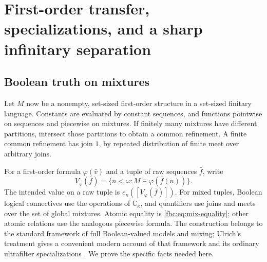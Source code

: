 \documentclass[11pt,letterpaper]{article}
\theoremstyle{definition}
\theoremstyle{remark}
\newcommand{\om}{\omega}
\newcommand{\C}{\mathbb C}
\begin{document}
\section{First-order transfer, specializations, and a sharp infinitary separation}
\label{fbc:sec:logic}

\subsection{Boolean truth on mixtures}
Let $M$ now be a nonempty, set-sized first-order structure in a
set-sized finitary language. Constants are evaluated by constant
sequences, and functions pointwise on sequences and piecewise on
mixtures. If finitely many mixtures have different partitions,
intersect those partitions to obtain a common refinement. A finite
common refinement has join $1$, by repeated distribution of finite meet
over arbitrary joins.

For a first-order formula $\varphi(\bar v)$ and a tuple of raw
sequences $\bar f$, write
\[
 V_\varphi(\bar f)=
 \{n<\om:M\models\varphi(\bar f(n))\}.
\]
The intended value on a raw tuple is $e_\kappa([V_\varphi(\bar f)])$.
For mixed tuples, Boolean logical connectives use the operations of
$\C_\kappa$, and quantifiers use joins and meets over the set of
global mixtures. Atomic equality is \eqref{fbc:eq:mix-equality}; other
atomic relations use the analogous piecewise formula. The construction
belongs to the standard framework of full Boolean-valued models and
mixing; Ulrich's treatment gives a convenient modern account of that
framework and its ordinary ultrafilter specializations
\cite[Sections~2--3]{Ulrich}. We prove the specific facts needed here.
\end{document}
